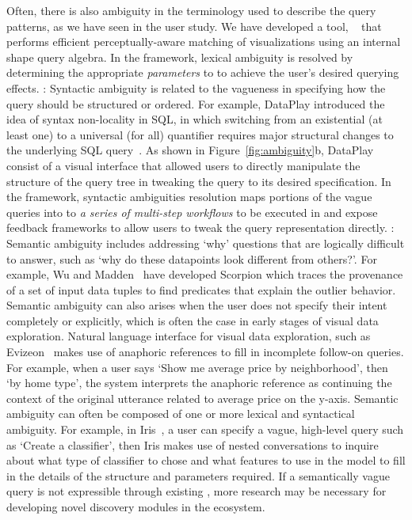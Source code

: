 Often, there is also ambiguity in the terminology used to describe the query patterns, as we have seen in the \zv user study. We have developed a tool, \ssearch~\cite{Siddiqui2018} that performs efficient  perceptually-aware matching of visualizations using an internal shape query algebra. In the \vida framework, lexical ambiguity is resolved by determining the appropriate \textit{parameters} to \vidaql to achieve the user's desired querying effects.
: Syntactic ambiguity is related to the vagueness in specifying how the query should be structured or ordered. For example, DataPlay introduced the idea of syntax non-locality in SQL, in which switching from an existential (at least one) to a universal (for all) quantifier requires major structural changes to the underlying SQL query~\cite{Abouzied2012}. As shown in Figure~\ref{fig:ambiguity}b, DataPlay consist of a visual interface that allowed users to directly manipulate the structure of the query tree in tweaking the query to its desired specification. In the \vida framework, syntactic ambiguities resolution maps portions of the vague queries into to \textit{a series of multi-step workflows} to be executed in \vidaql and expose feedback frameworks to allow users to tweak the query representation directly. %
: Semantic ambiguity includes addressing `why' questions that are logically difficult to answer, such as `why do these datapoints look different from others?'. For example, Wu and Madden~\cite{Wu2013} have developed Scorpion which traces the provenance of a set of input data tuples to find predicates that explain the outlier behavior. Semantic ambiguity can also arises when the user does not specify their intent completely or explicitly, which is often the case in early stages of visual data exploration. Natural language interface for visual data exploration, such as Evizeon~\cite{Hoque2017} makes use of anaphoric references to fill in incomplete follow-on queries. For example, when a user says `Show me average price by neighborhood', then `by home type', the system interprets the anaphoric reference as continuing the context of the original utterance related to average price on the y-axis. Semantic ambiguity can often be composed of one or more lexical and syntactical ambiguity. For example, in Iris~\cite{Fast2018}, a user can specify a vague, high-level query such as `Create a classifier', then Iris makes use of nested conversations to inquire about what type of classifier to chose and what features to use in the model to fill in the details of the structure and parameters required. If a semantically vague query is not expressible through existing \vidaql, more research may be necessary for developing novel discovery modules in the \vida ecosystem.


